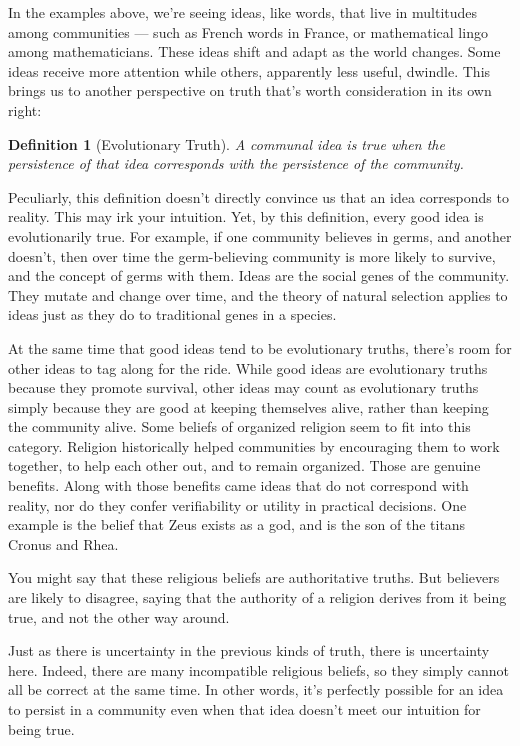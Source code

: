 \documentclass[9pt, twoside]{book}
\newtheorem*{defn}{Definition}
\theoremstyle{argtstyle}
\begin{document}
In the examples above, we're seeing ideas, like words, that live in multitudes
among communities --- such as French words in France, or mathematical lingo
among mathematicians. These ideas shift and adapt as the world changes.
Some ideas receive more attention while others, apparently less useful, dwindle.
This brings us to another perspective on truth that's worth
consideration in its own right:
\begin{defn}[Evolutionary Truth]
    A communal idea is true when the persistence of that idea corresponds
    with the persistence of the community.
\end{defn}

Peculiarly, this definition doesn't directly convince us that an idea
corresponds to reality. This may irk your intuition.
Yet, by this definition, every good idea is evolutionarily true.
For example, if one community believes in germs, and another
doesn't, then over time the germ-believing community is more likely to survive,
and the concept of germs with them.
Ideas are the social genes of the community.
They mutate and change over time, and the theory of natural selection
applies to ideas just as they do to traditional genes in a species.

At the same time that good ideas tend to be evolutionary truths, there's room
for other ideas to tag along for the ride.
While good ideas are evolutionary truths because they promote survival, other
ideas may count as evolutionary truths simply because they are good at
keeping themselves alive, rather than keeping the community alive.
Some beliefs of organized religion seem to fit into this category.
Religion historically helped communities
by encouraging them to work together, to help each other
out, and to remain organized. Those are genuine benefits. Along with those
benefits came ideas that do not correspond with reality, nor do they confer
verifiability or utility in practical decisions. One example is the belief that
Zeus exists as a god, and is the son of the titans Cronus and Rhea.

You might say that these religious beliefs are authoritative truths.
But believers are likely to disagree, saying that the authority of a
religion derives from it being true, and not the other way around.

Just as there is uncertainty in the previous kinds of truth, there is
uncertainty here.
Indeed, there are many incompatible religious beliefs, so they simply
cannot all be correct at the same time.
In other words, it's perfectly possible for an idea to persist in a community
even when that idea doesn't meet our intuition for being true.
\end{document}
